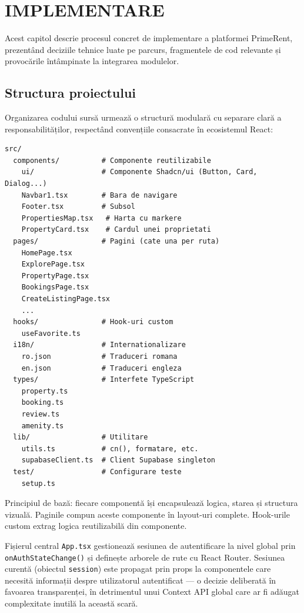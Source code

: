 \documentclass[12pt,a4paper,oneside]{report}
\begin{document}
\chapter{IMPLEMENTARE}

Acest capitol descrie procesul concret de implementare a platformei PrimeRent, prezentând deciziile tehnice luate pe parcurs, fragmentele de cod relevante și provocările întâmpinate la integrarea modulelor.

\section{Structura proiectului}

Organizarea codului sursă urmează o structură modulară cu separare clară a responsabilităților, respectând convențiile consacrate în ecosistemul React:

\begin{lstlisting}[caption={Structura directoarelor proiectului PrimeRent}]
src/
  components/          # Componente reutilizabile
    ui/                # Componente Shadcn/ui (Button, Card, Dialog...)
    Navbar1.tsx        # Bara de navigare
    Footer.tsx         # Subsol
    PropertiesMap.tsx   # Harta cu markere
    PropertyCard.tsx    # Cardul unei proprietati
  pages/               # Pagini (cate una per ruta)
    HomePage.tsx
    ExplorePage.tsx
    PropertyPage.tsx
    BookingsPage.tsx
    CreateListingPage.tsx
    ...
  hooks/               # Hook-uri custom
    useFavorite.ts
  i18n/                # Internationalizare
    ro.json            # Traduceri romana
    en.json            # Traduceri engleza
  types/               # Interfete TypeScript
    property.ts
    booking.ts
    review.ts
    amenity.ts
  lib/                 # Utilitare
    utils.ts           # cn(), formatare, etc.
    supabaseClient.ts  # Client Supabase singleton
  test/                # Configurare teste
    setup.ts
\end{lstlisting}

Principiul de bază: fiecare componentă își encapsulează logica, starea și structura vizuală. Paginile compun aceste componente în layout-uri complete. Hook-urile custom extrag logica reutilizabilă din componente.

Fișierul central \texttt{App.tsx} gestionează sesiunea de autentificare la nivel global prin \texttt{onAuthStateChange()} și definește arborele de rute cu React Router. Sesiunea curentă (obiectul \texttt{session}) este propagat prin props la componentele care necesită informații despre utilizatorul autentificat — o decizie deliberată în favoarea transparenței, în detrimentul unui Context API global care ar fi adăugat complexitate inutilă la această scară.
\end{document}
